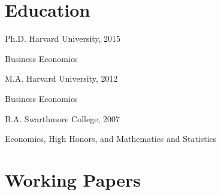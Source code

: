 \documentclass[letterpaper]{article}
\renewenvironment{itemize}{
  \begin{list}{}
    { \setlength{\itemsep}{5pt}
      \setlength{\parsep}{0pt}
      \setlength{\topsep}{0pt}
      \setlength{\leftmargin}{0em} } }{
  \end{list}}
\begin{document}
\section*{Education}

\begin{itemize}
\item Ph.D. Harvard University, 2015
  \begin{itemize}
  \item Business Economics
  \end{itemize}
\item M.A. Harvard University, 2012
  \begin{itemize}
  \item Business Economics
  \end{itemize}
\item B.A. Swarthmore College, 2007
  \begin{itemize}
  \item Economics, High Honors, and Mathematics and Statistics
  \end{itemize}
\end{itemize}

\section*{Working Papers}
\end{document}
